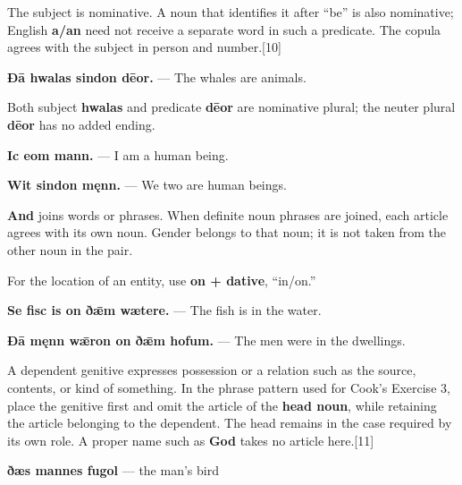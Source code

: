 The subject is nominative. A noun that identifies it after “be” is also nominative; English \textbf{a/\allowbreak{}an} need not receive a separate word in such a predicate. The copula agrees with the subject in person and number.[10]

\textbf{Ðā hwalas sindon dēor.} — The whales are animals.

Both subject \textbf{hwalas} and predicate \textbf{dēor} are nominative plural; the neuter plural \textbf{dēor} has no added ending.

\textbf{Ic eom mann.} — I am a human being.

\textbf{Wit sindon męnn.} — We two are human beings.

\textbf{And} joins words or phrases. When definite noun phrases are joined, each article agrees with its own noun. Gender belongs to that noun; it is not taken from the other noun in the pair.

For the location of an entity, use \textbf{on + dative}, “in/\allowbreak{}on.”

\textbf{Se fisc is on ðǣm wætere.} — The fish is in the water.

\textbf{Ðā męnn wǣron on ðǣm hofum.} — The men were in the dwellings.

A dependent genitive expresses possession or a relation such as the source, contents, or kind of something. In the phrase pattern used for Cook's Exercise 3, place the genitive first and omit the article of the \textbf{head noun}, while retaining the article belonging to the dependent. The head remains in the case required by its own role. A proper name such as \textbf{God} takes no article here.[11]

\textbf{ðæs mannes fugol} — the man's bird

